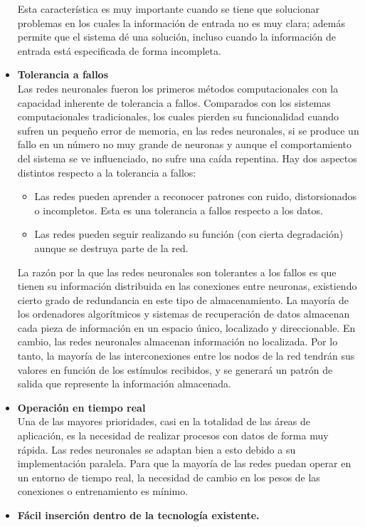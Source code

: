 \begin{itemize}
{Esta característica es muy importante cuando se tiene que
solucionar problemas en los cuales la información de entrada no es muy clara; además
permite que el sistema dé una solución, incluso cuando la información de entrada está
especificada de forma incompleta. 
 } 
 \item {\textbf{ Tolerancia a fallos }\\
 Las redes neuronales fueron los primeros métodos computacionales con la capacidad inherente de tolerancia a fallos. Comparados con los sistemas 
 computacionales tradicionales, los cuales pierden su funcionalidad cuando sufren un pequeño error de memoria, en las redes neuronales, si se 
 produce un fallo en un número no muy grande de neuronas y aunque el comportamiento del sistema se ve influenciado, no sufre una caída repentina.
Hay dos aspectos distintos respecto a la tolerancia a fallos:
\begin{itemize}
\item Las redes pueden aprender a reconocer patrones con ruido, distorsionados o
incompletos. Esta es una tolerancia a fallos respecto a los datos.
\item Las redes pueden seguir realizando su función (con cierta degradación)
aunque se destruya parte de la red.
\end{itemize}
La razón por la que las redes neuronales son tolerantes a los fallos es que tienen
su información distribuida en las conexiones entre neuronas, existiendo cierto grado de
redundancia en este tipo de almacenamiento. La mayoría de los ordenadores
algorítmicos y sistemas de recuperación de datos almacenan cada pieza de información
en un espacio único, localizado y direccionable. En cambio, las redes neuronales
almacenan información no localizada. Por lo tanto, la mayoría de las interconexiones
entre los nodos de la red tendrán sus valores en función de los estímulos recibidos, y se
generará un patrón de salida que represente la información almacenada. 
 } 
 \item {\textbf{ Operación en tiempo real }\\
 Una de las mayores prioridades, casi en la totalidad de las áreas de aplicación, es
la necesidad de realizar procesos con datos de forma muy rápida. Las redes neuronales
se adaptan bien a esto debido a su implementación paralela. Para que la mayoría de las
redes puedan operar en un entorno de tiempo real, la necesidad de cambio en los pesos
de las conexiones o entrenamiento es mínimo.
 } 
 \item {\textbf{ Fácil inserción dentro de la tecnología existente. }\\
}
\end{itemize}
